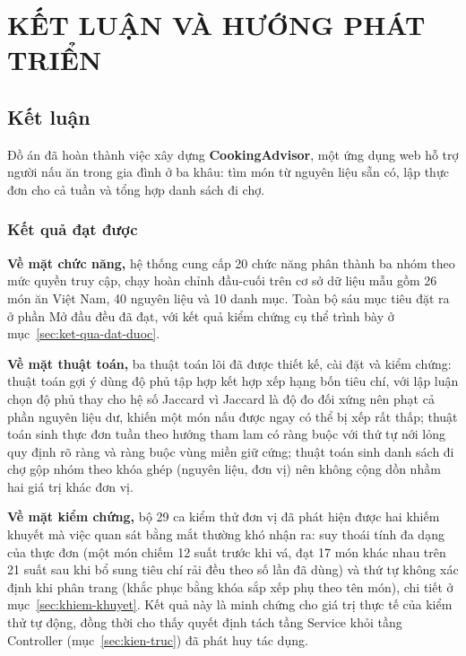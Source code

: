 \chapter{KẾT LUẬN VÀ HƯỚNG PHÁT TRIỂN}
\label{ch:ket-luan}

\section{Kết luận}

Đồ án đã hoàn thành việc xây dựng \textbf{CookingAdvisor}, một ứng dụng web hỗ
trợ người nấu ăn trong gia đình ở ba khâu: tìm món từ nguyên liệu sẵn có, lập
thực đơn cho cả tuần và tổng hợp danh sách đi chợ.

\subsection{Kết quả đạt được}

\textbf{Về mặt chức năng,} hệ thống cung cấp 20 chức năng phân thành ba nhóm theo
mức quyền truy cập, chạy hoàn chỉnh đầu-cuối trên cơ sở dữ liệu mẫu gồm 26 món ăn
Việt Nam, 40 nguyên liệu và 10 danh mục. Toàn bộ sáu mục tiêu đặt ra ở phần Mở
đầu đều đã đạt, với kết quả kiểm chứng cụ thể trình bày ở
mục~\ref{sec:ket-qua-dat-duoc}.

\textbf{Về mặt thuật toán,} ba thuật toán lõi đã được thiết kế, cài đặt và kiểm
chứng: thuật toán gợi ý dùng độ phủ tập hợp kết hợp xếp hạng bốn tiêu chí, với
lập luận chọn độ phủ thay cho hệ số Jaccard vì Jaccard là độ đo đối xứng nên
phạt cả phần nguyên liệu dư, khiến một món nấu được ngay có thể bị xếp rất thấp;
thuật toán sinh thực đơn tuần theo hướng tham lam có ràng buộc với thứ tự nới
lỏng quy định rõ ràng và ràng buộc vùng miền giữ cứng; thuật toán sinh danh sách
đi chợ gộp nhóm theo khóa ghép (nguyên liệu, đơn vị) nên không cộng dồn nhầm hai
giá trị khác đơn vị.

\textbf{Về mặt kiểm chứng,} bộ 29 ca kiểm thử đơn vị đã phát hiện được hai khiếm
khuyết mà việc quan sát bằng mắt thường khó nhận ra: suy thoái tính đa dạng của
thực đơn (một món chiếm 12 suất trước khi vá, đạt 17 món khác nhau trên 21 suất
sau khi bổ sung tiêu chí rải đều theo số lần đã dùng) và thứ tự không xác định
khi phân trang (khắc phục bằng khóa sắp xếp phụ theo tên món), chi tiết ở
mục~\ref{sec:khiem-khuyet}. Kết quả này là minh chứng cho giá trị thực tế của
kiểm thử tự động, đồng thời cho thấy quyết định tách tầng Service khỏi tầng
Controller (mục~\ref{sec:kien-truc}) đã phát huy tác dụng.

